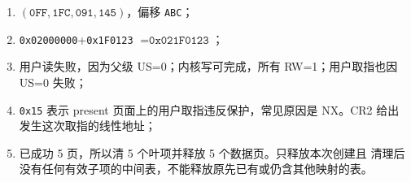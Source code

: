 \begin{answerbox}
\begin{enumerate}[leftmargin=2.2em]
  \item \((\texttt{0FF},\texttt{1FC},\texttt{091},
    \texttt{145})\)，偏移 \texttt{ABC}；
  \item \texttt{0x02000000}+\texttt{0x1F0123}
    \(=\texttt{0x021F0123}\)；
  \item 用户读失败，因为父级 US=0；内核写可完成，所有 RW=1；用户取指也因
    US=0 失败；
  \item \texttt{0x15} 表示 present 页面上的用户取指违反保护，常见原因是
    NX。CR2 给出发生这次取指的线性地址；
  \item 已成功 5 页，所以清 5 个叶项并释放 5 个数据页。只释放本次创建且
    清理后没有任何有效子项的中间表，不能释放原先已有或仍含其他映射的表。
\end{enumerate}
\end{answerbox}
